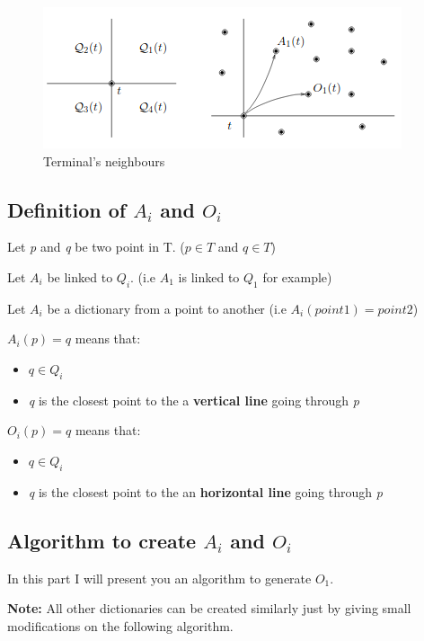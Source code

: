 \begin{figure}[H]
  \includegraphics[width=\linewidth]{img/terminal_neighbours.png}
  \caption{Terminal's neighbours}
  \label{fig:terminal_neighbours}
\end{figure}

\subsection{Definition of $A_i$ and $O_i$}
\noindent Let \emph{p} and \emph{q} be two point in T. ($p \in T$ and $q \in T$)

\noindent Let $A_i$ be linked to $Q_i$. (i.e $A_1$ is linked to $Q_1$ for example)

\noindent Let $A_i$ be a dictionary from a point to another (i.e $A_i(point1) = point2$)\newline

\noindent $A_i(p) = q$ means that:
\begin{itemize}[noitemsep, nolistsep]
	\item{ $q \in Q_i$}
	\item{ \emph{q} is the closest point to the a \textbf{vertical line} going through \emph{p}}
\end{itemize}

\noindent $O_i(p) = q$ means that:
\begin{itemize}[noitemsep, nolistsep]
	\item{ $q \in Q_i$}
	\item{ \emph{q} is the closest point to the an \textbf{horizontal line} going through \emph{p}}
\end{itemize}

\subsection{Algorithm to create $A_i$ and $O_i$}
In this part I will present you an algorithm to generate $O_1$.

\noindent \textbf{Note:} All other dictionaries can be created similarly just by giving small modifications on the following algorithm.
 
